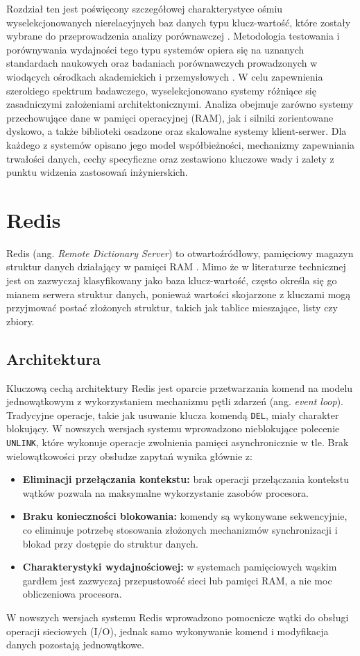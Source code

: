 Rozdział ten jest poświęcony szczegółowej charakterystyce ośmiu wyselekcjonowanych nierelacyjnych baz danych typu klucz-wartość, które zostały wybrane do przeprowadzenia analizy porównawczej \cite{sadalage2012}. Metodologia testowania i porównywania wydajności tego typu systemów opiera się na uznanych standardach naukowych oraz badaniach porównawczych prowadzonych w wiodących ośrodkach akademickich i przemysłowych \cite{cooper2010, li2015}. W celu zapewnienia szerokiego spektrum badawczego, wyselekcjonowano systemy różniące się zasadniczymi założeniami architektonicznymi. Analiza obejmuje zarówno systemy przechowujące dane w pamięci operacyjnej (RAM), jak i silniki zorientowane dyskowo, a także biblioteki osadzone oraz skalowalne systemy klient-serwer. Dla każdego z systemów opisano jego model współbieżności, mechanizmy zapewniania trwałości danych, cechy specyficzne oraz zestawiono kluczowe wady i zalety z punktu widzenia zastosowań inżynierskich.

\section{Redis}
Redis (ang. \emph{Remote Dictionary Server}) to otwartoźródłowy, pamięciowy magazyn struktur danych działający w pamięci RAM \cite{carlson2013}. Mimo że w literaturze technicznej jest on zazwyczaj klasyfikowany jako baza klucz-wartość, często określa się go mianem serwera struktur danych, ponieważ wartości skojarzone z kluczami mogą przyjmować postać złożonych struktur, takich jak tablice mieszające, listy czy zbiory.
\subsection{Architektura}
Kluczową cechą architektury Redis jest oparcie przetwarzania komend na modelu jednowątkowym z wykorzystaniem mechanizmu pętli zdarzeń (ang. \emph{event loop}). Tradycyjne operacje, takie jak usuwanie klucza komendą \texttt{DEL}, miały charakter blokujący. W nowszych wersjach systemu wprowadzono nieblokujące polecenie \texttt{UNLINK}, które wykonuje operacje zwolnienia pamięci asynchronicznie w tle. Brak wielowątkowości przy obsłudze zapytań wynika głównie z:
\begin{itemize}
    \item \textbf{Eliminacji przełączania kontekstu:} brak operacji przełączania kontekstu wątków pozwala na maksymalne wykorzystanie zasobów procesora.
    \item \textbf{Braku konieczności blokowania:} komendy są wykonywane sekwencyjnie, co eliminuje potrzebę stosowania złożonych mechanizmów synchronizacji i blokad przy dostępie do struktur danych.
    \item \textbf{Charakterystyki wydajnościowej:} w systemach pamięciowych wąskim gardłem jest zazwyczaj przepustowość sieci lub pamięci RAM, a nie moc obliczeniowa procesora.
\end{itemize}
W nowszych wersjach systemu Redis wprowadzono pomocnicze wątki do obsługi operacji sieciowych (I/O), jednak samo wykonywanie komend i modyfikacja danych pozostają jednowątkowe.
